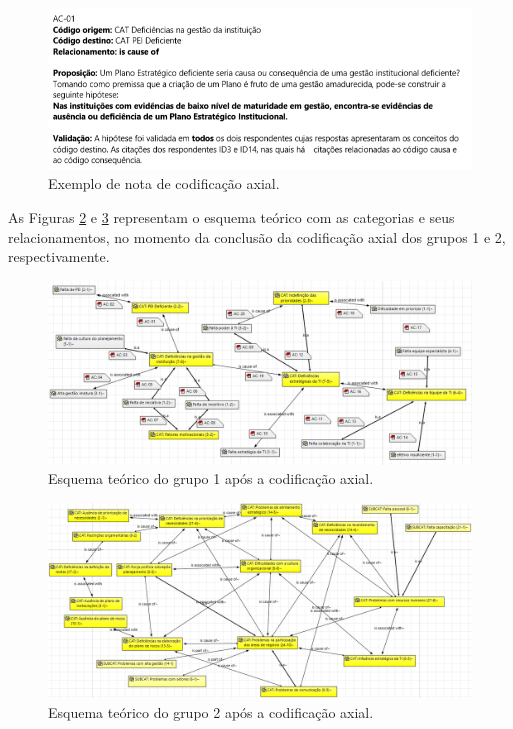 \begin{figure}[h!]
\centering %
\includegraphics[width=16cm, frame]{figuras/ac_memo.PNG}
\caption{Exemplo de nota de codificação axial.}
\label{figura:ac_memo}
\end{figure}

As Figuras \ref{figura:ac_grupo1} e \ref{figura:ac_grupo2} representam o esquema teórico com as categorias e seus relacionamentos, no momento da conclusão da codificação axial dos grupos 1 e 2, respectivamente.

\begin{figure}[!ht]
\centering %
\includegraphics[width=16cm, frame]{figuras/ac_grupo1.PNG}
\caption{Esquema teórico do grupo 1 após a codificação axial.}
\label{figura:ac_grupo1}
\end{figure}

\begin{figure}[!ht]
\centering %
\includegraphics[width=16cm, frame]{figuras/ac_grupo2.PNG}
\caption{Esquema teórico do grupo 2 após a codificação axial.}
\label{figura:ac_grupo2}
\end{figure}

